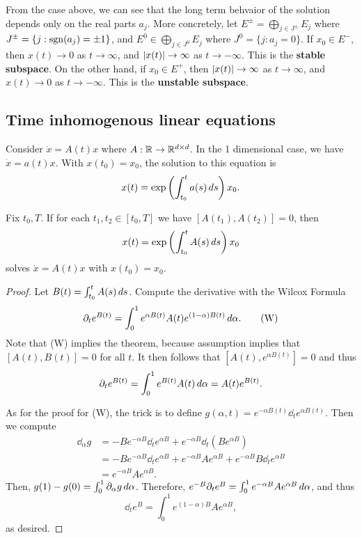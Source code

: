 \documentclass[a4paper]{article}
\begin{document}
From the case above, we can see that the long term behvaior of the
solution depends only on the real parts $a_j$. More concretely, let $E^\pm
= \bigoplus_{j \in J^\pm} E_j$ where $J^\pm = \{ j : \operatorname{sgn}(a_j) = \pm 1
\}$, and $E^0 \in \bigoplus_{j \in J^0} E_j$ where $J^0 = \{ j : a_j = 0
\}$. If $x_0 \in E^-$, then $x(t) \to 0$ as $t \to \infty$, and
$\left\lvert x(t)\right\rvert \to \infty$ as $t \to -\infty$. This is the \textbf{stable
subspace}. On the other hand, if $x_0 \in E^+$, then $\left\lvert x(t)\right\rvert \to
\infty$ as $t \to \infty$, and $x(t) \to 0$ as $t \to -\infty$. This is
the \textbf{unstable subspace}.

\subsection{Time inhomogenous linear equations}

Consider $\dot{x} = A(t) x$ where $A : \mathbb{R} \to \mathbb{R}^{d \times d}$. In the 1
dimensional case, we have $\dot{x} = a(t) x$. With $x(t_0) = x_0$, the
solution to this equation is
\[
  x(t) = \exp \left( \int_{t_0}^t a(s) \, d s \right) x_0.
\]

\begin{thm}
  Fix $t_0, T$. If for each $t_1, t_2 \in [t_0, T]$ we have
  $[A(t_1), A(t_2)] = 0$, then
  \[
    x(t) = \exp \left( \int_{t_0}^t A(s) \, d s \right) x_0
  \]
  solves $\dot{x} = A(t) x$ with $x(t_0) = x_0$.
\end{thm}

\begin{proof}
  Let $B(t) = \int_{t_0}^{t} A(s) \, d s$. Compute the derivative with
  the Wilcox Formula
  \[
    \partial_t e^{B(t)} = \int_0^1 e^{\alpha B(t)} A(t) e^{(1 - \alpha) B(t)}
    \, d \alpha. \tag{W}
  \]
  Note that (W) implies the theorem, because assumption implies that
  $[A(t), B(t)] = 0$ for all $t$. It then follows that $[A(t), e^{\alpha
  B(t)}] = 0$ and thus
  \[
    \partial_t e^{B(t)} = \int_0^1 e^{B(t)} A(t) \, d \alpha = A(t) e^{B(t)}.
  \]

  As for the proof for (W), the trick is to define $g(\alpha, t) = e^{-
  \alpha B(t)} \dd_t e^{\alpha B(t)}$. Then we compute
  \begin{align*}
    \dd_\alpha g
     & = - B e^{-\alpha B} \dd_t e^{\alpha B}
    + e^{-\alpha B} \dd_t (B e^{\alpha B})                                   \\
     & = - B e^{-\alpha B} \dd_t e^{\alpha B} + e^{-\alpha B} A e^{\alpha B}
    + e^{-\alpha B} B \dd_t e^{\alpha B}                                     \\
     & = e^{-\alpha B} A e^{\alpha B}.
  \end{align*}
  Then, $g(1) - g(0) = \int_0^1 \partial_\alpha g \, d \alpha$. Therefore,
  $e^{-B} \partial_t e^{B} = \int_0^1 e^{-\alpha B} A e^{\alpha B} \, d \alpha$,
  and thus
  \[
    \dd_t e^B = \int_0^1 e^{(1 - \alpha) B} A e^{\alpha B},
  \]
  as desired.

\end{proof}
\end{document}
